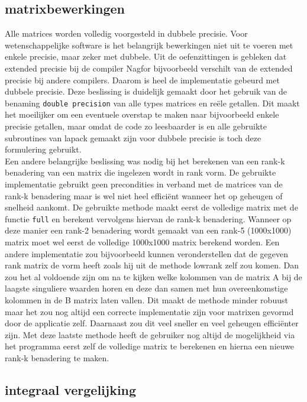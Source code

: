\documentclass[a4paper]{article}
\begin{document}
\subsection*{matrixbewerkingen}
Alle matrices worden volledig voorgesteld in dubbele precisie. Voor wetenschappelijke software is het belangrijk bewerkingen niet uit te voeren met enkele precisie, maar zeker met dubbele. Uit de oefenzittingen is gebleken dat extended precisie bij de compiler Nagfor bijvoorbeeld verschilt van de extended precisie bij andere compilers. Daarom is heel de implementatie gebeurd met dubbele precisie. Deze beslissing is duidelijk gemaakt door het gebruik van de benaming \verb!double precision! van alle types matrices en re\"ele getallen. Dit maakt het moeilijker om een eventuele overstap te maken naar bijvoorbeeld enkele precisie getallen, maar omdat de code zo leesbaarder is en alle gebruikte subroutines van lapack gemaakt zijn voor dubbele precisie is toch deze formulering gebruikt. \\
Een andere belangrijke beslissing was nodig bij het berekenen van een rank-k benadering van een matrix die ingelezen wordt in rank vorm. De gebruikte implementatie gebruikt geen precondities in verband met de matrices van de rank-k benadering maar is wel niet heel effici\"ent wanneer het op geheugen of snelheid aankomt. De gebruikte methode maakt eerst de volledige matrix met de functie \verb!full! en berekent vervolgens hiervan de rank-k benadering. Wanneer op deze manier een rank-2 benadering wordt gemaakt van een rank-5 (1000x1000) matrix moet wel eerst de volledige 1000x1000 matrix berekend worden. Een andere implementatie zou bijvoorbeeld kunnen veronderstellen dat de gegeven rank matrix de vorm heeft zoals hij uit de methode lowrank zelf zou komen. Dan zou het al voldoende zijn om na te kijken welke kolommen van de matrix A bij de laagste singuliere waarden horen en deze dan samen met hun overeenkomstige kolommen in de B matrix laten vallen. Dit maakt de methode minder robuust maar het zou nog altijd een correcte implementatie zijn voor matrixen gevormd door de applicatie zelf. Daarnaast zou dit veel sneller en veel geheugen effici\"enter zijn. Met deze laatste methode heeft de gebruiker nog altijd de mogelijkheid via het programma eerst zelf de volledige matrix te berekenen en hierna een nieuwe rank-k benadering te maken.

\subsection*{integraal vergelijking}
\end{document}
